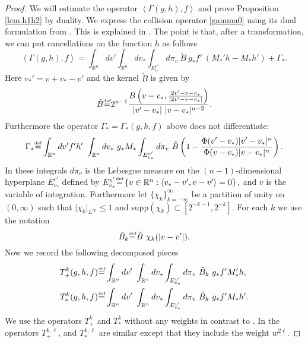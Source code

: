 \documentclass{amsart}
\numberwithin{equation}{section}
\begin{document}
\begin{proof}
We will estimate the operator ${ \left< {{\Gamma(g,h),f}} \right> }$ and prove Proposition \ref{lem.h1h2} by duality.   We express the collision operator \eqref{gamma0} using its dual formulation from \cite[(A.1)]{gsNonCut0}.  This is explained in \cite[Proposition A.1 and (3.2)]{gsNonCut0}.  The point is that, after a transformation, we can put cancellations on the function $h$ as follows
\begin{equation}
{ \left< {{ \Gamma(g,h),  f }} \right> }
=
\int_{{\mathbb R}^{n}} dv'   \int_{{\mathbb R}^{n}} dv_* \int_{E_{v_*}^{v'}} d \pi_{v}  
~ \tilde{B} ~ g_*  f'    ~ \left( M_*' h - M_* h' \right)
+
{\Gamma_{*}}.
\label{dualOPdef}
\end{equation}
Here 
$
 v_*' = v+v_* - v'
$
and the kernel $\tilde{B}$ is given by
\begin{equation}
\tilde{B}
{\overset{\mbox{\tiny{def}}}{=}}
2^{n-1}
\frac{B\left(v-v_*, \frac{2v' - v- v_*}{|2v' - v- v_*|}\right) }{  |v'-v_*| ~ |v-v_*|^{n-2}}.
\label{kernelTILDE}
\end{equation}
Furthermore the operator ${\Gamma_{*}}={\Gamma_{*}}(g,h,f)$ above  does not differentiate:
\begin{equation}
{\Gamma_{*}}
 {\overset{\mbox{\tiny{def}}}{=}} 
 \int_{{\mathbb R}^{n}} dv'  f'  h'  ~    \int_{{\mathbb R}^{n}} dv_*  ~  g_*   M_*  \int_{E_{v_*}^{v'}} d \pi_{v} ~  \tilde{B} 
\left(1 -  \frac{\Phi(v'-v_*) |v' - v_*|^n}{\Phi(v-v_*) |v-v_*|^n}  \right).
 \label{opGlabel}
\end{equation}
In these integrals $d\pi_{v}$ is the Lebesgue measure on the $({n} - 1)$-dimensional hyperplane $E_{v_*}^{v'}$ 
defined by 
  $
  E^{v'}_{v_*} {\overset{\mbox{\tiny{def}}}{=}} \left\{ v\in {{\mathbb R}^{n}} : { \left< {{v_*-v', v - v'}} \right> } =0 \right\},
  $
and $v$ is the variable of integration.  
Furthermore let $\{ \chi_k \}_{k=-\infty}^\infty$ be a partition of unity on $(0,\infty)$ such that ${|} \chi_k{|}_{L^\infty} \leq 1$ and 
$\mbox{supp}\left( \chi_k \right)\subset [2^{-k-1},2^{-k}]$.  
For each $k$ we use the notation 
$$
\tilde{B}_k
{\overset{\mbox{\tiny{def}}}{=}}
\tilde{B}  ~ \chi_k (|v - v'|).
$$
Now we record the following decomposed pieces
\begin{equation}
\begin{split}
{T^{k}_{+}}(g,h,f)  & 
{\overset{\mbox{\tiny{def}}}{=}}  \int_{{\mathbb R}^{n}} dv' ~   \int_{{\mathbb R}^{n}} dv_* \int_{E_{v_*}^{v'}} d \pi_{v} ~ 
\tilde{B}_k ~  g_*  f' M_*' h, 
\\ 
{T^{k}_{*}}(g,h,f) & 
{\overset{\mbox{\tiny{def}}}{=}}
 \int_{{\mathbb R}^{n}} dv' ~   \int_{{\mathbb R}^{n}} dv_* \int_{E_{v_*}^{v'}} d \pi_{v} ~ 
\tilde{B}_k ~ g_* f'   M_* h'.
\end{split}
\notag
\end{equation}
We use the operators ${T^{k}_{+}}$ and ${T^{k}_{*}}$ without any weights in contrast to \cite{gsNonCut0}.  In \cite{gsNonCut0} the operators $T^{k,\ell}_{+}$, and $T^{k,\ell}_{*}$ are similar except that they include the weight $w^{2\ell}$.


\end{proof}
\end{document}
